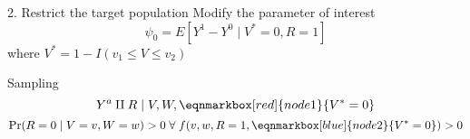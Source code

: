 \documentclass{beamer}
\begin{document}

\begin{frame}{2. Restrict the target population}
	Modify the parameter of interest
	\[\psi_0 = E[Y^1 - Y^0  \mid V^*=0, R=1]\]
	where $V^*=1 - I(v_1 \le V \le v_2)$
	~\\
	\begin{block}{Sampling}
		\begin{equation*}
			Y^a \amalg R \mid V,W, \eqnmarkbox[red]{node1}{V^* = 0}
		\end{equation*}
		\begin{equation*}
			\Pr(R=0 \mid V=v, W=w) > 0 \; \forall \; f(v,w,R=1,
			\eqnmarkbox[blue]{node2}{V^*=0}
			) > 0
		\end{equation*}
	\end{block}	
\end{frame}


\end{document}
